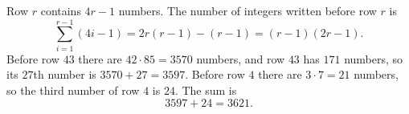 Row $r$ contains $4r-1$ numbers. The number of integers written before row $r$ is
\[\sum_{i=1}^{r-1}(4i-1)=2r(r-1)-(r-1)=(r-1)(2r-1).\]
Before row $43$ there are $42\cdot85=3570$ numbers, and row $43$ has $171$ numbers, so its $27$th number is $3570+27=3597$. Before row $4$ there are $3\cdot7=21$ numbers, so the third number of row $4$ is $24$. The sum is
\[3597+24=\boxed{3621}.\]
